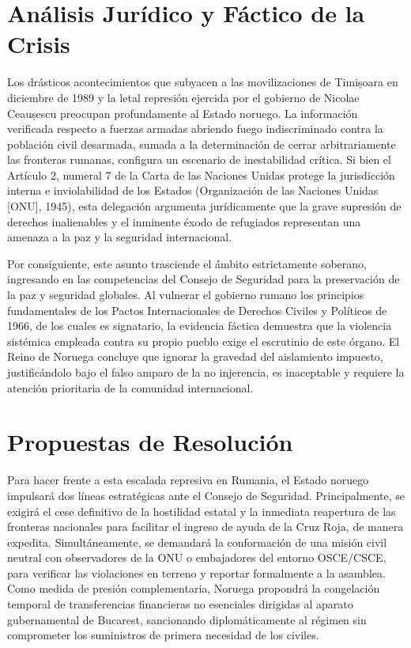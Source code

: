 \documentclass[11pt,a4paper]{article}
\begin{document}
\section*{Análisis Jurídico y Fáctico de la Crisis}
Los drásticos acontecimientos que subyacen a las movilizaciones de Timișoara en diciembre de 1989 y la letal represión ejercida por el gobierno de Nicolae Ceaușescu preocupan profundamente al Estado noruego. La información verificada respecto a fuerzas armadas abriendo fuego indiscriminado contra la población civil desarmada, sumada a la determinación de cerrar arbitrariamente las fronteras rumanas, configura un escenario de inestabilidad crítica. Si bien el Artículo 2, numeral 7 de la Carta de las Naciones Unidas protege la jurisdicción interna e inviolabilidad de los Estados (Organización de las Naciones Unidas [ONU], 1945), esta delegación argumenta jurídicamente que la grave supresión de derechos inalienables y el inminente éxodo de refugiados representan una amenaza a la paz y la seguridad internacional.

Por consiguiente, este asunto trasciende el ámbito estrictamente soberano, ingresando en las competencias del Consejo de Seguridad para la preservación de la paz y seguridad globales. Al vulnerar el gobierno rumano los principios fundamentales de los Pactos Internacionales de Derechos Civiles y Políticos de 1966, de los cuales es signatario, la evidencia fáctica demuestra que la violencia sistémica empleada contra su propio pueblo exige el escrutinio de este órgano. El Reino de Noruega concluye que ignorar la gravedad del aislamiento impuesto, justificándolo bajo el falso amparo de la no injerencia, es inaceptable y requiere la atención prioritaria de la comunidad internacional.

\section*{Propuestas de Resolución}
Para hacer frente a esta escalada represiva en Rumania, el Estado noruego impulsará dos líneas estratégicas ante el Consejo de Seguridad. Principalmente, se exigirá el cese definitivo de la hostilidad estatal y la inmediata reapertura de las fronteras nacionales para facilitar el ingreso de ayuda de la Cruz Roja, de manera expedita. Simultáneamente, se demandará la conformación de una misión civil neutral con observadores de la ONU o embajadores del entorno OSCE/CSCE, para verificar las violaciones en terreno y reportar formalmente a la asamblea. Como medida de presión complementaria, Noruega propondrá la congelación temporal de transferencias financieras no esenciales dirigidas al aparato gubernamental de Bucarest, sancionando diplomáticamente al régimen sin comprometer los suministros de primera necesidad de los civiles.
\end{document}
